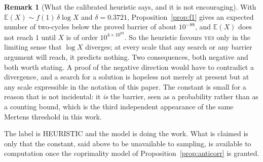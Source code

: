 \documentclass[11pt]{article}
\theoremstyle{definition}
\newtheorem{remark}[theorem]{Remark}
\begin{document}
\begin{remark}[What the calibrated heuristic says, and it is not encouraging]\label{rem:calibrated}
With $\mathbb{E}(X)\sim f(1)\,\delta\log X$ and $\delta=0.3721$, Proposition~\ref{prop:f1} gives an
expected number of two-cycles below the proved barrier of about $10^{-88}$, and $\mathbb{E}(X)$ does
not reach $1$ until $X$ is of order $10^{4\times10^{89}}$. So the heuristic favours \textsc{yes} only
in the limiting sense that $\log X$ diverges; at every scale that any search or any barrier argument
will reach, it predicts nothing. Two consequences, both negative and both worth stating. A proof of
the negative direction would have to contradict a divergence, and a search for a solution is
hopeless not merely at present but at any scale expressible in the notation of this paper. The
constant is small for a reason that is not incidental: it \emph{is} the barrier, seen as a
probability rather than as a counting bound, which is the third independent appearance of the same
Mertens threshold in this work.

The label is \textup{HEURISTIC} and the model is doing the work. What is claimed is only that the
constant, said above to be unavailable to sampling, is available to computation once the coprimality
model of Proposition~\ref{prop:anticorr} is granted.
\end{remark}
\end{document}

